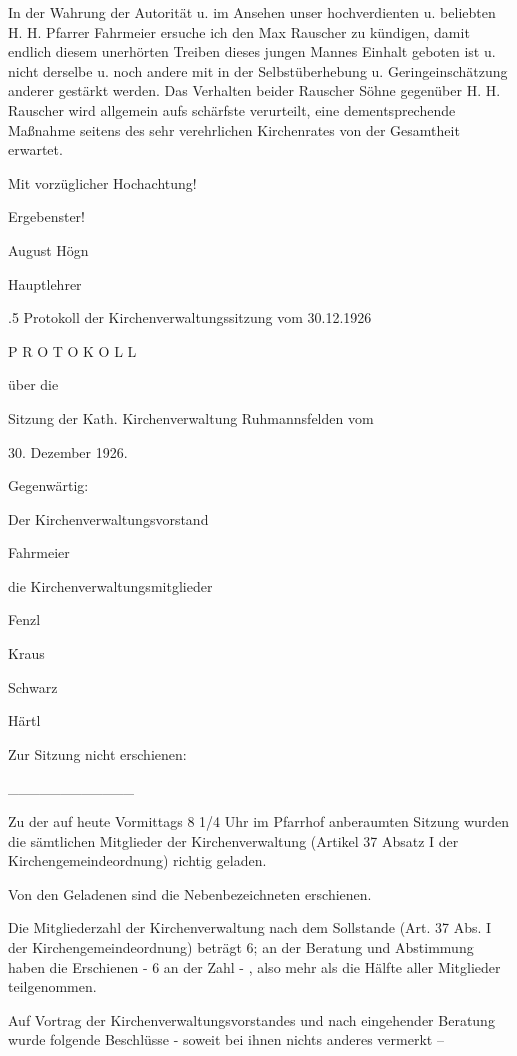\documentclass{book}
\begin{document}
In der Wahrung der Autorität u. im Ansehen unser hochverdienten u. beliebten H.
H. Pfarrer Fahrmeier ersuche ich den Max Rauscher zu kündigen, damit endlich
diesem unerhörten Treiben dieses jungen Mannes Einhalt geboten ist u. nicht
derselbe u. noch andere mit in der Selbstüberhebung u. Geringeinschätzung
anderer gestärkt werden. Das Verhalten beider Rauscher Söhne gegenüber H. H.
Rauscher wird allgemein aufs schärfste verurteilt, eine dementsprechende
Maßnahme seitens des sehr verehrlichen Kirchenrates von der Gesamtheit erwartet.



    Mit vorzüglicher Hochachtung!

        Ergebenster!

            August Högn

                Hauptlehrer

.5 Protokoll der Kirchenverwaltungssitzung vom 30.12.1926

P R O T O K O L L

über die

Sitzung der Kath. Kirchenverwaltung Ruhmannsfelden vom

30. Dezember 1926.



Gegenwärtig:

Der Kirchenverwaltungsvorstand

Fahrmeier

die Kirchenverwaltungsmitglieder

Fenzl

Kraus

Schwarz

Härtl

Zur Sitzung nicht erschienen:

____________

Zu der auf heute Vormittags 8 1/4 Uhr im Pfarrhof anberaumten Sitzung wurden die
sämtlichen Mitglieder der Kirchenverwaltung (Artikel 37 Absatz I der
Kirchengemeindeordnung) richtig geladen.

Von den Geladenen sind die Nebenbezeichneten erschienen.

Die Mitgliederzahl der Kirchenverwaltung nach dem Sollstande (Art. 37 Abs. I der
Kirchengemeindeordnung) beträgt 6; an der Beratung und Abstimmung haben die
Erschienen - 6 an der Zahl - , also mehr als die Hälfte aller Mitglieder
teilgenommen.

Auf Vortrag der Kirchenverwaltungsvorstandes und nach eingehender Beratung wurde
folgende Beschlüsse - soweit bei ihnen nichts anderes vermerkt –
\end{document}
